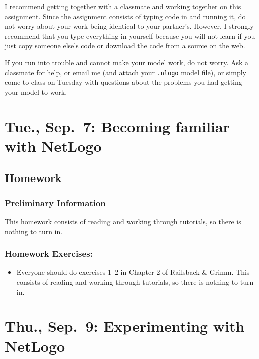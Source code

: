 \documentclass[
]{article}
\providecommand{\tightlist}{%
  \setlength{\itemsep}{0pt}\setlength{\parskip}{0pt}}
\begin{document}
I recommend getting together with a classmate and working together on
this assignment. Since the assignment consists of typing code in and
running it, do not worry about your work being identical to your
partner's. However, I strongly recommend that you type everything in
yourself because you will not learn if you just copy someone else's code
or download the code from a source on the web.

If you run into trouble and cannot make your model work, do not worry.
Ask a classmate for help, or email me (and attach your \texttt{.nlogo}
model file), or simply come to class on Tuesday with questions about the
problems you had getting your model to work.

\hypertarget{tue.-sep.-7-becoming-familiar-with-netlogo}{%
\section{Tue., Sep.~7: Becoming familiar with
NetLogo}\label{tue.-sep.-7-becoming-familiar-with-netlogo}}

\hypertarget{homework-2}{%
\subsection{Homework}\label{homework-2}}

\hypertarget{preliminary-information-1}{%
\subsubsection{Preliminary
Information}\label{preliminary-information-1}}

This homework consists of reading and working through tutorials, so
there is nothing to turn in.

\hypertarget{homework-exercises-2}{%
\subsubsection{Homework Exercises:}\label{homework-exercises-2}}

\begin{itemize}
\tightlist
\item
  Everyone should do exercises 1--2 in Chapter 2 of Railsback \& Grimm.
  This consists of reading and working through tutorials, so there is
  nothing to turn in.
\end{itemize}

\hypertarget{thu.-sep.-9-experimenting-with-netlogo}{%
\section{Thu., Sep.~9: Experimenting with
NetLogo}\label{thu.-sep.-9-experimenting-with-netlogo}}
\end{document}
